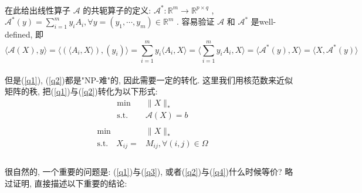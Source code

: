 \documentclass[a4paper, UTF8]{ctexart}				%
\numberwithin{equation}{section}				%
\begin{document}
			\paragraph{}
				\quad 在此给出线性算子 $\mathcal{A}$ 的共轭算子的定义:
				$\mathcal{A}^*: \mathbb{R}^{m} \rightarrow \mathbb{R}^{p \times q}$ ,
				$\mathcal{A}^*(y) = \sum^m_{i = 1}y_i A_i, \forall y = (y_1, \cdots, y_m) \in \mathbb{R}^{m}$ .
				容易验证 $\mathcal{A}$ 和 $\mathcal{A}^*$ 是well-defined, 即
				\[
						\langle{\mathcal{A}(X), y}\rangle 
					=	\langle{(\langle{A_i, X}\rangle), (y_i)}\rangle
					=	\sum^m_{i = 1}y_i \langle{A_i, X}\rangle
					=	\langle{\sum^m_{i = 1}y_i A_i, X}\rangle
					=	\langle{\mathcal{A}^*(y), X}\rangle
					=	\langle{X, \mathcal{A}^*(y)}\rangle
				\]

			\paragraph{}
				\quad 但是(\ref{q1}), (\ref{q2})都是"NP-难"的, 因此需要一定的转化. 这里我们用核范数来近似矩阵的秩, 把(\ref{q1})与(\ref{q2})转化为以下形式:
				\begin{equation}
                    \begin{split}\label{q3}
                        \min \quad
                            & \lVert{X}\rVert_*\\
                        \text{s.t.} \quad
                            & \mathcal{A}(X) = b\\	
                    \end{split}
                \end{equation}
                \begin{equation}
                    \begin{split}\label{q4}
                        \min \quad
                            & \lVert{X}\rVert_*\\
                        \text{s.t.} \quad
                            X_{ij} = &M_{ij}, \forall(i,j)\in\Omega\\
                    \end{split}
                \end{equation}

			\paragraph{}
				\quad 很自然的, 一个重要的问题是: (\ref{q1})与(\ref{q3}), 或者(\ref{q2})与(\ref{q4})什么时候等价? 略过证明, 直接描述以下重要的结论:
\end{document}
